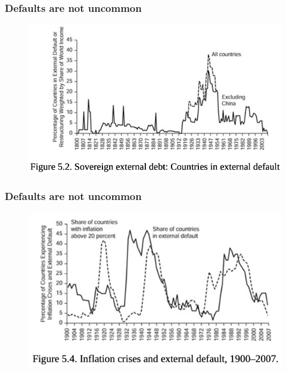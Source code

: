 \documentclass{beamer}
\begin{document}
\begin{frame}
\frametitle{Defaults are not uncommon}
\begin{figure}
\centering
\includegraphics[scale=0.4]{RR1.png}
\end{figure}
\end{frame}

\begin{frame}
\frametitle{Defaults are not uncommon}
\begin{figure}
\centering
\includegraphics[scale=0.5]{RR2.png}
\end{figure}
\end{frame}
\end{document}
